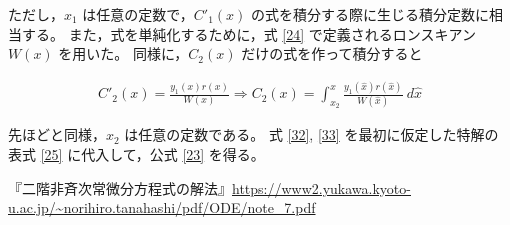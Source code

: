 \documentclass[10pt, a4paper]{ltjsarticle}
\begin{document}
ただし，$x_1$ は任意の定数で，$C'_1(x)$ の式を積分する際に生じる積分定数に相当する。
また，式を単純化するために，式 \eqref{24} で定義されるロンスキアン $W(x)$ を用いた。
同様に，$C_2(x)$ だけの式を作って積分すると

\begin{gather}
  C'_2(x) = \frac{y_1(x)r(x)}{W(x)}
  \Rightarrow C_2(x) =
  \int_{x_2}^{x}\frac{y_1(\hat{x})r(\hat{x})}{W(\hat{x})}\:d\hat{x} \label{33}
\end{gather}

先ほどと同様，$x_2$ は任意の定数である。
式 \eqref{32}, \eqref{33} を最初に仮定した特解の表式 \eqref{25} に代入して，公式 \eqref{23} を得る。

\begin{thebibliography}{99}
  『二階非斉次常微分方程式の解法』\url{https://www2.yukawa.kyoto-u.ac.jp/~norihiro.tanahashi/pdf/ODE/note_7.pdf}
\end{thebibliography}
\end{document}
